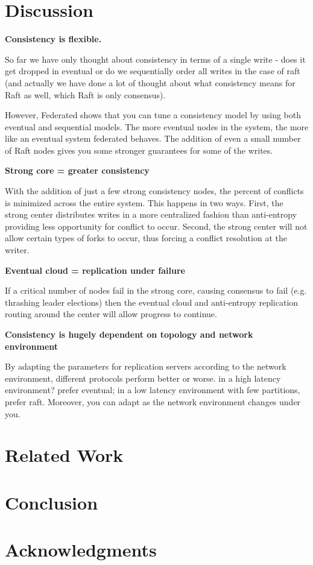 \documentclass[letterpaper,twocolumn,10pt]{article}
\begin{document}
\section{Discussion}

\textbf{Consistency is flexible.}

So far we have only thought about consistency in terms of a single write - does it get dropped in eventual or do we sequentially order all writes in the case of raft (and actually we have done a lot of thought about what consistency means for Raft as well, which Raft is only consensus).

However, Federated shows that you can tune a consistency model by using both eventual and sequential models. The more eventual nodes in the system, the more like an eventual system federated behaves. The addition of even a small number of Raft nodes gives you some stronger guarantees  for some of the writes.

\textbf{Strong core = greater consistency}

With the addition of just a few strong consistency nodes, the percent of conflicts is minimized across the entire system. This happens in two ways. First, the strong center distributes writes in a more centralized fashion than anti-entropy providing less opportunity for conflict to occur. Second, the strong center will not allow certain types of forks to occur, thus forcing a conflict resolution at the writer.

\textbf{Eventual cloud = replication under failure}

If a critical number of nodes fail in the strong core, causing consensus to fail (e.g. thrashing leader elections) then the eventual cloud and anti-entropy replication routing around the center will allow progress to continue.

\textbf{Consistency is hugely dependent on topology and network environment}

By adapting the parameters for replication servers according to the network environment, different protocols perform better or worse. in a high latency environment? prefer eventual; in a low latency environment with few partitions, prefer raft. Moreover, you can adapt as the network environment changes under you.

\section{Related Work}

\section{Conclusion}

\section*{Acknowledgments}

{\footnotesize 
}

\end{document}
